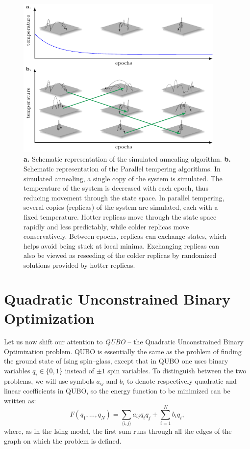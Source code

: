 \begin{figure}[bh]
  \centering
  \includegraphics[width=0.91\textwidth]{figures/pt_and_sa.pdf}
  \caption{\textbf{a.} Schematic representation of the simulated annealing algorithm.
    \textbf{b.} Schematic representation of the Parallel tempering algorithms. In simulated annealing, a single copy of the
    system is simulated. The temperature of the system is decreased with each
    epoch, thus reducing movement through the state space. In parallel tempering,
    several copies (replicas) of the system are simulated, each with a fixed
    temperature. Hotter replicas move through the state space rapidly and less
    predictably, while colder replicas move conservatively. Between epochs,
    replicas can exchange states, which helps avoid being stuck at local minima.
    Exchanging replicas can also be viewed as reseeding of the colder replicas by
    randomized solutions provided by hotter replicas.} \label{fig:sa}
\end{figure}

\section{Quadratic Unconstrained Binary Optimization}

Let us now shift our attention to \emph{QUBO} -- the Quadratic Unconstrained Binary
Optimization problem. QUBO is essentially the same as the problem of finding
the ground state of Ising spin--glass, except that in QUBO one uses binary
variables $q_{i} \in \{0, 1\}$ instead of $\pm 1$ spin variables. To
distinguish between the two problems, we will use symbols $a_{ij}$ and $b_{i}$
to denote respectively quadratic and linear coefficients in QUBO, so the energy
function to be minimized can be written as:
\begin{equation}
  \label{eq:qubo}
  F(q_1, \ldots, q_N) =  \sum_{\langle i, j \rangle} a_{ij} q_i q_j + \sum_{i=1}^N b_iq_i,
\end{equation}
where, as in the Ising model, the first sum runs through all the edges of the
graph on which the problem is defined.

